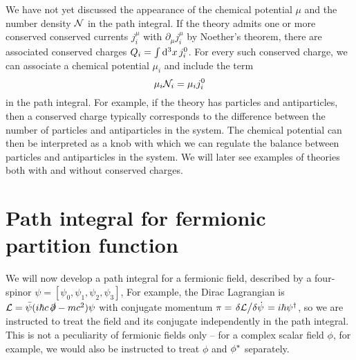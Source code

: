 We have not yet discussed the appearance of the chemical potential $\mu$ and the number density $\mathcal{N}$ in the path integral.
If the theory admits one or more conserved conserved currents $j_i^\mu$ with $\partial_\mu j_i^\mu$ by Noether's theorem, there are associated conserved charges $Q_i = \int \mathop{}\!\mathrm{d}^3 x \, j_i^0$.
For every such conserved charge, we can associate a chemical potential $\mu_i$ and include the term
\begin{equation}
	\mu_i \mathcal{N}_i = \mu_i j_i^0
\label{eq:tft:chemical_potential}
\end{equation}
in the path integral.
For example, if the theory has particles and antiparticles, then a conserved charge typically corresponds to the difference between the number of particles and antiparticles in the system.
The chemical potential can then be interpreted as a knob with which we can regulate the balance between particles and antiparticles in the system.
We will later see examples of theories both with and without conserved charges.


\section{Path integral for fermionic partition function}

\newcommand\creat{\hat\psi^\dagger}
\newcommand\destr{\hat\psi        }

We will now develop a path integral for a fermionic field, described by a four-spinor $\psi = [ \psi_0, \psi_1, \psi_2, \psi_3 ]$,
For example, the Dirac Lagrangian is $\mathcal{L} = \bar{\psi} (i \hbar c \, \slashed\partial - m c^2) \psi$ with conjugate momentum $\pi = \fdv{\lagr}/{\dot\psi} = i \hbar \psi^\dagger$, so we are instructed to treat the field and its conjugate independently in the path integral.
This is not a peculiarity of fermionic fields only -- for a complex scalar field $\phi$, for example, we would also be instructed to treat $\phi$ and ${\phi}^*$ separately. 


